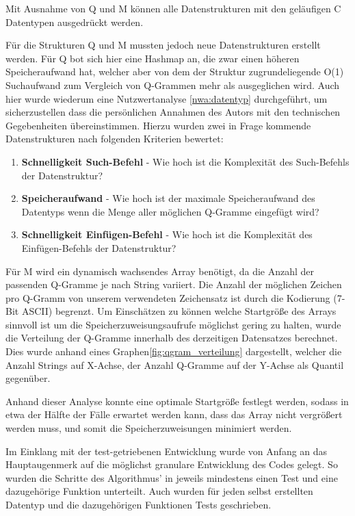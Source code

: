 Mit Ausnahme von Q und M können alle Datenstrukturen mit den geläufigen C
Datentypen ausgedrückt werden.

Für die Strukturen Q und M mussten jedoch neue Datenstrukturen
erstellt werden. Für Q bot sich hier eine Hashmap an, die zwar einen höheren Speicheraufwand hat, welcher aber von dem der Struktur zugrundeliegende
O(1) Suchaufwand zum Vergleich von Q-Grammen mehr als ausgeglichen wird. Auch hier wurde wiederum eine Nutzwertanalyse \ref{nwa:datentyp} durchgeführt,
um sicherzustellen dass die persönlichen Annahmen des Autors mit den technischen
Gegebenheiten übereinstimmen.
Hierzu wurden zwei in Frage kommende Datenstrukturen nach folgenden Kriterien bewertet:

\begin{enumerate}
	\item \textbf{Schnelligkeit Such-Befehl} - Wie hoch ist die Komplexität des Such-Befehls der Datenstruktur?
    \item \textbf{Speicheraufwand} - Wie hoch ist der maximale Speicheraufwand des Datentyps wenn die Menge aller möglichen Q-Gramme eingefügt wird?
    \item \textbf{Schnelligkeit Einfügen-Befehl} - Wie hoch ist die Komplexität des Einfügen-Befehls der Datenstruktur?\\

\end{enumerate}

Für M wird ein dynamisch wachsendes Array benötigt, da die Anzahl der passenden
Q-Gramme je nach String variiert. Die Anzahl der möglichen Zeichen pro Q-Gramm von unserem verwendeten Zeichensatz ist durch die Kodierung (7-Bit ASCII) begrenzt. Um Einschätzen zu können welche Startgröße des Arrays sinnvoll ist um die Speicherzuweisungsaufrufe möglichst gering zu halten, wurde die Verteilung der Q-Gramme innerhalb des derzeitigen Datensatzes berechnet. Dies wurde anhand eines
Graphen\ref{fig:qgram_verteilung} dargestellt, welcher die Anzahl Strings auf X-Achse, der Anzahl Q-Gramme auf der Y-Achse als Quantil gegenüber.

Anhand dieser Analyse konnte eine optimale Startgröße festlegt werden, sodass in etwa der Hälfte der Fälle
erwartet werden kann, dass das Array nicht vergrößert werden muss, und somit die
Speicherzuweisungen minimiert werden.


Im Einklang mit der test-getriebenen Entwicklung wurde von Anfang an das Hauptaugenmerk
auf die möglichst granulare Entwicklung des Codes gelegt. So wurden die Schritte
des Algorithmus' in jeweils mindestens einen Test und eine dazugehörige Funktion unterteilt.
Auch wurden für jeden selbst erstellten Datentyp und die dazugehörigen Funktionen Tests geschrieben.

